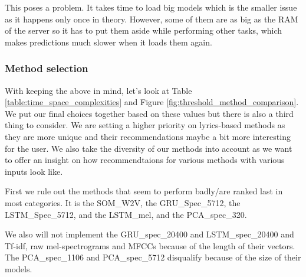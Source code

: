 This poses a problem. It takes time to load big models which is the smaller issue as it happens only once in theory. However, some of them are as big as the RAM of the server so it has to put them aside while performing other tasks, which makes predictions much slower when it loads them again.

\subsubsection{Method selection}\label{ssec:method_selection}

With keeping the above in mind, let's look at Table \ref{table:time_space_complexities} and Figure \ref{fig:threshold_method_comparison}. We put our final choices together based on these values but there is also a third thing to consider. We are setting a higher priority on lyrics-based methods as they are more unique and their recommendations maybe a bit more interesting for the user. We also take the diversity of our methods into account as we want to offer an insight on how recommendtaions for various methods with various inputs look like. 

First we rule out the methods that seem to perform badly/are ranked last in most categories. It is the SOM\_W2V, the GRU\_Spec\_5712, the LSTM\_Spec\_5712, and the LSTM\_mel, and the PCA\_spec\_320. 

We also will not implement the GRU\_spec\_20400 and LSTM\_spec\_20400 and Tf-idf, raw mel-spectrograms and MFCCs because of the length of their vectors. The PCA\_spec\_1106 and PCA\_spec\_5712 disqualify because of the size of their models. 

